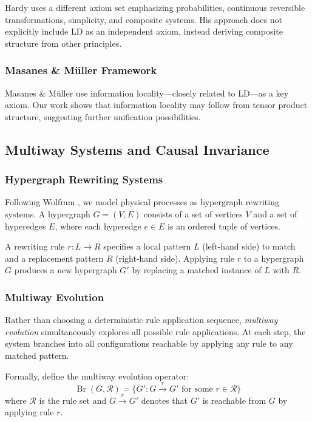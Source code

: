 \documentclass[11pt,a4paper]{article}
\theoremstyle{definition}
\theoremstyle{remark}
\DeclareMathOperator{\Br}{Br}
\begin{document}
Hardy \cite{hardy2001quantum} uses a different axiom set emphasizing probabilities, continuous reversible transformations, simplicity, and composite systems. His approach does not explicitly include LD as an independent axiom, instead deriving composite structure from other principles.

\subsubsection{Masanes \& Müller Framework}

Masanes \& Müller \cite{masanes2011general} use information locality---closely related to LD---as a key axiom. Our work shows that information locality may follow from tensor product structure, suggesting further unification possibilities.

\subsection{Multiway Systems and Causal Invariance}

\subsubsection{Hypergraph Rewriting Systems}

Following Wolfram \cite{wolfram2020new}, we model physical processes as hypergraph rewriting systems. A hypergraph $G = (V, E)$ consists of a set of vertices $V$ and a set of hyperedges $E$, where each hyperedge $e \in E$ is an ordered tuple of vertices.

A rewriting rule $r: L \to R$ specifies a local pattern $L$ (left-hand side) to match and a replacement pattern $R$ (right-hand side). Applying rule $r$ to a hypergraph $G$ produces a new hypergraph $G'$ by replacing a matched instance of $L$ with $R$.

\subsubsection{Multiway Evolution}

Rather than choosing a deterministic rule application sequence, \textit{multiway evolution} simultaneously explores all possible rule applications. At each step, the system branches into all configurations reachable by applying any rule to any matched pattern.

Formally, define the multiway evolution operator:
\begin{equation}
\Br(G, \mathcal{R}) = \{G' : G \xrightarrow{r} G' \text{ for some } r \in \mathcal{R}\}
\end{equation}
where $\mathcal{R}$ is the rule set and $G \xrightarrow{r} G'$ denotes that $G'$ is reachable from $G$ by applying rule $r$.
\end{document}

